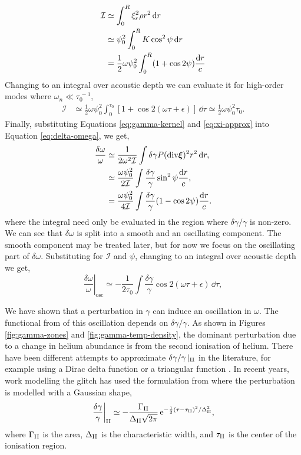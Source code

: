 \begin{align}
    \mathcal{I} &\simeq \int_0^R \xi_r^2 \rho r^2 \, \mathrm{d} r \notag\\
    &\simeq \psi_0^2 \int_0^R K \cos^2\psi \, \mathrm{d} r \notag \\
    &= \frac12 \omega \psi_0^2 \int_0^R (1 + \cos 2 \psi) \frac{\mathrm{d} r}{c}
\end{align}
%
Changing to an integral over acoustic depth we can evaluate it for high-order modes where \(\omega_n \ll \tau_0^{\,-1}\),
%
\begin{align}
    \mathcal{I} &\simeq \frac12 \omega \psi_0^2 \int_0^{\tau_0} [1 + \cos 2 (\omega\tau + \epsilon)] \, \dd \tau \simeq \frac12 \omega \psi_0^2 \tau_0.
\end{align}
%
Finally, substituting Equations \ref{eq:gamma-kernel} and \ref{eq:xi-approx} into Equation \ref{eq:delta-omega}, we get,
%
\begin{align}
    \frac{\delta\omega}{\omega} &\simeq \frac{1}{2\omega^2\mathcal{I}} \int \delta\gamma P (\mathrm{div} \bm{\xi})^2 r^2 \, \mathrm{d} r, \notag \\
    &\simeq \frac{\omega \psi_0^2}{2 \mathcal{I}} \int \frac{\delta\gamma}{\gamma}\sin^2\psi\frac{\mathrm{d} r}{c}, \notag \\
    &= \frac{\omega \psi_0^2}{4 \mathcal{I}} \int \frac{\delta\gamma}{\gamma}(1 - \cos 2\psi)\frac{\mathrm{d} r}{c}.
\end{align}
%
where the integral need only be evaluated in the region where \(\delta\gamma / \gamma\) is non-zero. We can see that \(\delta\omega\) is split into a smooth and an oscillating component. The smooth component may be treated later, but for now we focus on the oscillating part of \(\delta\omega\). Substituting for \(\mathcal{I}\) and \(\psi\), changing to an integral over acoustic depth we get,
%
\begin{equation}
    \left.\frac{\delta\omega}{\omega}\right|_\mathrm{osc} \simeq - \frac{1}{2\tau_0} \int \frac{\delta\gamma}{\gamma} \cos 2 (\omega\tau + \epsilon) \, \dd \tau,
\end{equation}
%

We have shown that a perturbation in \(\gamma\) can induce an oscillation in \(\omega\). The functional from of this oscillation depends on \(\delta\gamma/\gamma\). As shown in Figures \ref{fig:gamma-zones} and \ref{fig:gamma-temp-density}, the dominant perturbation due to a change in helium abundance is from the second ionisation of helium. There have been different attempts to approximate \(\delta\gamma/\gamma\,|_{{\mathrm{II}}}\) in the literature, for example using a Dirac delta function or a triangular function \citep{Monteiro.Christensen-Dalsgaard.ea1994, Monteiro.Thompson2005}. In recent years, work modelling the glitch has used the formulation from \citet{Houdek.Gough2007} where the perturbation is modelled with a Gaussian shape,
%
\begin{equation}
    \left.\frac{\delta\gamma}{\gamma}\right|_{{\mathrm{II}}} \simeq - \frac{\Gamma_{{\mathrm{II}}}}{\Delta_{{\mathrm{II}}} \sqrt{2\pi}} \, \mathrm{e}^{- \frac12{(\tau - \tau_{{\mathrm{II}}})^2}/{\Delta_{{\mathrm{II}}}^2} }, \label{eq:he-gamma}
\end{equation}
%
where \(\Gamma_{{\mathrm{II}}}\) is the area, \(\Delta_{{\mathrm{II}}}\) is the characteristic width, and \(\tau_{{\mathrm{II}}}\) is the center of the ionisation region.

